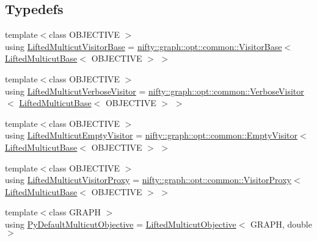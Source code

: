 \subsection*{Typedefs}
\begin{DoxyCompactItemize}
\item 
{\footnotesize template$<$class O\+B\+J\+E\+C\+T\+I\+VE $>$ }\\using \hyperlink{namespacenifty_1_1graph_1_1opt_1_1lifted__multicut_a3350124f8869505fecf39d697b9b2718}{Lifted\+Multicut\+Visitor\+Base} = \hyperlink{classnifty_1_1graph_1_1opt_1_1common_1_1VisitorBase}{nifty\+::graph\+::opt\+::common\+::\+Visitor\+Base}$<$ \hyperlink{classnifty_1_1graph_1_1opt_1_1lifted__multicut_1_1LiftedMulticutBase}{Lifted\+Multicut\+Base}$<$ O\+B\+J\+E\+C\+T\+I\+VE $>$ $>$
\item 
{\footnotesize template$<$class O\+B\+J\+E\+C\+T\+I\+VE $>$ }\\using \hyperlink{namespacenifty_1_1graph_1_1opt_1_1lifted__multicut_a820671dadb730a13fd57f011e3c0f6ce}{Lifted\+Multicut\+Verbose\+Visitor} = \hyperlink{classnifty_1_1graph_1_1opt_1_1common_1_1VerboseVisitor}{nifty\+::graph\+::opt\+::common\+::\+Verbose\+Visitor}$<$ \hyperlink{classnifty_1_1graph_1_1opt_1_1lifted__multicut_1_1LiftedMulticutBase}{Lifted\+Multicut\+Base}$<$ O\+B\+J\+E\+C\+T\+I\+VE $>$ $>$
\item 
{\footnotesize template$<$class O\+B\+J\+E\+C\+T\+I\+VE $>$ }\\using \hyperlink{namespacenifty_1_1graph_1_1opt_1_1lifted__multicut_a5004a60975a330999c409f23ae3b74e9}{Lifted\+Multicut\+Empty\+Visitor} = \hyperlink{classnifty_1_1graph_1_1opt_1_1common_1_1EmptyVisitor}{nifty\+::graph\+::opt\+::common\+::\+Empty\+Visitor}$<$ \hyperlink{classnifty_1_1graph_1_1opt_1_1lifted__multicut_1_1LiftedMulticutBase}{Lifted\+Multicut\+Base}$<$ O\+B\+J\+E\+C\+T\+I\+VE $>$ $>$
\item 
{\footnotesize template$<$class O\+B\+J\+E\+C\+T\+I\+VE $>$ }\\using \hyperlink{namespacenifty_1_1graph_1_1opt_1_1lifted__multicut_a2b56d863219c7b968e884cc86a4e56a7}{Lifted\+Multicut\+Visitor\+Proxy} = \hyperlink{classnifty_1_1graph_1_1opt_1_1common_1_1VisitorProxy}{nifty\+::graph\+::opt\+::common\+::\+Visitor\+Proxy}$<$ \hyperlink{classnifty_1_1graph_1_1opt_1_1lifted__multicut_1_1LiftedMulticutBase}{Lifted\+Multicut\+Base}$<$ O\+B\+J\+E\+C\+T\+I\+VE $>$ $>$
\item 
{\footnotesize template$<$class G\+R\+A\+PH $>$ }\\using \hyperlink{namespacenifty_1_1graph_1_1opt_1_1lifted__multicut_a50eb6f4cbd7b34af026c6031669b85cb}{Py\+Default\+Multicut\+Objective} = \hyperlink{classnifty_1_1graph_1_1opt_1_1lifted__multicut_1_1LiftedMulticutObjective}{Lifted\+Multicut\+Objective}$<$ G\+R\+A\+PH, double $>$
\end{DoxyCompactItemize}
